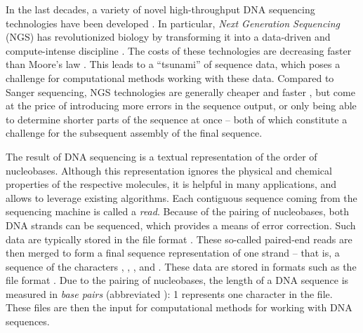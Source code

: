 In the last decades, a variety of novel high-throughput DNA sequencing technologies
have been developed \cite{Pettersson2009,Reuter2015,Deiner2017b}.
In particular, \emph{Next Generation Sequencing} (NGS) \cite{Logares2012,Mardis2013}
has revolutionized biology by transforming it into a data-driven and compute-intense discipline \citep{Escobar-Zepeda2015}.
The costs of these technologies are decreasing faster than Moore's law \cite{Wetterstrand2018}.
This leads to a ``tsunami'' of sequence data,
which poses a challenge for computational methods working with these data.
Compared to Sanger sequencing, NGS technologies are generally cheaper and faster \cite{Voelkerding2009,Metzker2010},
but come at the price of introducing more errors in the sequence output,
or only being able to determine shorter parts of the sequence at once
-- both of which constitute a challenge for the subsequent assembly of the final sequence.

The result of DNA sequencing is a textual representation of the order of nucleobases.
Although this representation ignores the physical and chemical properties of the respective molecules,
it is helpful in many applications, and allows to leverage existing algorithms.
Each contiguous sequence coming from the sequencing machine is called a \emph{read}.
Because of the pairing of nucleobases,
both DNA strands can be sequenced, which provides a means of error correction.
Such data are typically stored in the  file format \citep{Cock2009}.
These so-called paired-end reads are then merged to form a final sequence representation of one strand
-- that is, a sequence of the characters , , , and .
These data are stored in formats such as the  file format \citep{Pearson1988}.
Due to the pairing of nucleobases,
the length of a DNA sequence is measured in \emph{base pairs} (abbreviated \si{\basepair}):
\SI{1}{\basepair} represents one character in the file.
These files are then the input for computational methods for working with DNA sequences.



